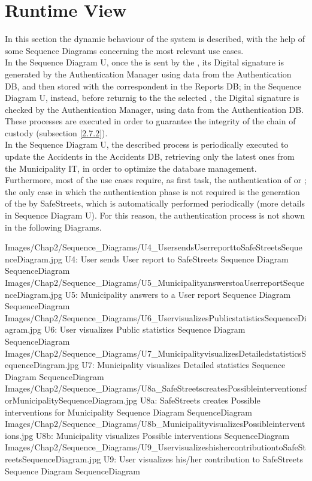 \documentclass[../../DD.tex]{subfiles}
\begin{document}
\section{Runtime View\label{sect:2.4}}

In this section the dynamic behaviour of the system is described, with the help of some Sequence Diagrams concerning the most relevant use cases.\\

In the Sequence Diagram U, once the  is sent by the , its Digital signature is generated by the Authentication Manager using data from the Authentication DB, and then stored with the correspondent  in the Reports DB; in the Sequence Diagram U, instead, before returnig to the  the selected , the Digital signature is checked by the Authentication Manager, using data from the Authentication DB.\\
These processes are executed in order to guarantee the integrity of the  chain of custody (subsection \ref{2.7.2}).\\

In the Sequence Diagram U, the described process is periodically executed to update the Accidents in the Accidents DB, retrieving only the latest ones from the Municipality IT, in order to optimize the database management.\\

Furthermore, most of the use cases require, as first task, the authentication of  or ; the only case in which the authentication phase is not required is the generation of the  by SafeStreets, which is automatically performed periodically (more details in Sequence Diagram U). For this reason, the authentication process is not shown in the following Diagrams.

\image {10cm} {Images/Chap2/Sequence_Diagrams/U4_UsersendsUserreporttoSafeStreetsSequenceDiagram.jpg} {U4: User sends User report to SafeStreets Sequence Diagram} {SequenceDiagram}
\image {8cm} {Images/Chap2/Sequence_Diagrams/U5_MunicipalityanswerstoaUserreportSequenceDiagram.jpg} {U5: Municipality answers to a User report Sequence Diagram} {SequenceDiagram}
\image {8cm} {Images/Chap2/Sequence_Diagrams/U6_UservisualizesPublicstatisticsSequenceDiagram.jpg} {U6: User visualizes Public statistics Sequence Diagram} {SequenceDiagram}
\image {12cm} {Images/Chap2/Sequence_Diagrams/U7_MunicipalityvisualizesDetailedstatisticsSequenceDiagram.jpg} {U7: Municipality visualizes Detailed statistics Sequence Diagram} {SequenceDiagram}
\image {10cm} {Images/Chap2/Sequence_Diagrams/U8a_SafeStreetscreatesPossibleinterventionsforMunicipalitySequenceDiagram.jpg} {U8a: SafeStreets creates Possible interventions for Municipality Sequence Diagram} {SequenceDiagram}
\image {4cm} {Images/Chap2/Sequence_Diagrams/U8b_MunicipalityvisualizesPossibleinterventions.jpg} {U8b: Municipality visualizes Possible interventions} {SequenceDiagram}
\image {8cm} {Images/Chap2/Sequence_Diagrams/U9_UservisualizeshishercontributiontoSafeStreetsSequenceDiagram.jpg} {U9: User visualizes his/her contribution to SafeStreets Sequence Diagram} {SequenceDiagram}

\newpage
\end{document}
